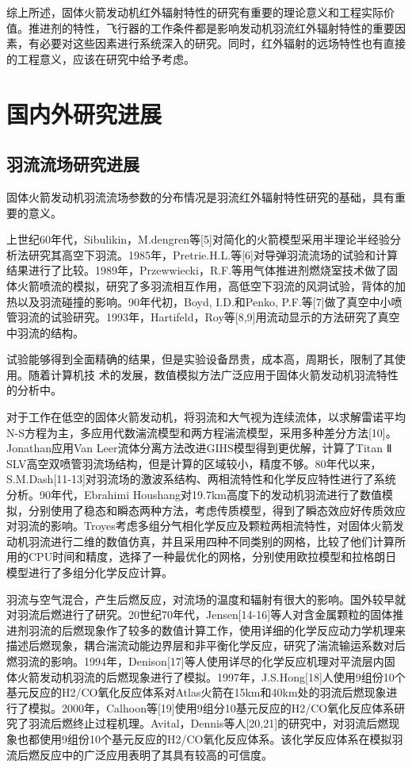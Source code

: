 综上所述，固体火箭发动机红外辐射特性的研究有重要的理论意义和工程实际价值。推进剂的特性，飞行器的工作条件都是影响发动机羽流红外辐射特性的重要因素，有必要对这些因素进行系统深入的研究。同时，红外辐射的远场特性也有直接的工程意义，应该在研究中给予考虑。

\section{国内外研究进展}
\subsection{羽流流场研究进展}
固体火箭发动机羽流流场参数的分布情况是羽流红外辐射特性研究的基础，具有重要的意义。

上世纪60年代，Sibulikin，M.dengren等[5]对简化的火箭模型采用半理论半经验分析法研究其高空下羽流。1985年，Pretrie.H.L.等[6]对导弹羽流流场的试验和计算结果进行了比较。1989年，Przewwiecki，R.F.等用气体推进剂燃烧室技术做了固体火箭喷流的模拟，研究了多羽流相互作用，高低空下羽流的风洞试验，背体的加热以及羽流碰撞的影响。90年代初，Boyd, I.D.和Penko, P.F.等[7]做了真空中小喷管羽流的试验研究。1993年，Hartifeld，Roy等[8,9]用流动显示的方法研究了真空中羽流的结构。

试验能够得到全面精确的结果，但是实验设备昂贵，成本高，周期长，限制了其使用。随着计算机技 术的发展，数值模拟方法广泛应用于固体火箭发动机羽流特性的分析中。

对于工作在低空的固体火箭发动机，将羽流和大气视为连续流体，以求解雷诺平均N-S方程为主，多应用代数湍流模型和两方程湍流模型，采用多种差分方法[10]。Jonathan应用Van Leer流体分离方法改进GIHS模型得到更优解，计算了Titan Ⅱ SLV高空双喷管羽流场结构，但是计算的区域较小，精度不够。80年代以来，S.M.Dash[11-13]对羽流场的激波系结构、两相流特性和化学反应特性进行了系统分析。90年代，Ebrahimi Houshang对19.7km高度下的发动机羽流进行了数值模拟，分别使用了稳态和瞬态两种方法，考虑传质模型，得到了瞬态效应好传质效应对羽流的影响。Troyes考虑多组分气相化学反应及颗粒两相流特性，对固体火箭发动机羽流进行二维的数值仿真，并且采用四种不同类别的网格，比较了他们计算所用的CPU时间和精度，选择了一种最优化的网格，分别使用欧拉模型和拉格朗日模型进行了多组分化学反应计算。

羽流与空气混合，产生后燃反应，对流场的温度和辐射有很大的影响。国外较早就对羽流后燃进行了研究。20世纪70年代，Jensen[14-16]等人对含金属颗粒的固体推进剂羽流的后燃现象作了较多的数值计算工作，使用详细的化学反应动力学机理来描述后燃现象，耦合湍流动能边界层和非平衡化学反应，研究了湍流输运系数对后燃羽流的影响。1994年，Denison[17]等人使用详尽的化学反应机理对平流层内固体火箭发动机羽流的后燃现象进行了模拟。1997年，J.S.Hong[18]人使用9组份10个基元反应的H2/CO氧化反应体系对Atlas火箭在15km和40km处的羽流后燃现象进行了模拟。2000年，Calhoon等[19]使用9组分10基元反应的H2/CO氧化反应体系研究了羽流后燃终止过程机理。Avital，Dennis等人[20,21]的研究中，对羽流后燃现象也都使用9组份10个基元反应的H2/CO氧化反应体系。该化学反应体系在模拟羽流后燃反应中的广泛应用表明了其具有较高的可信度。

